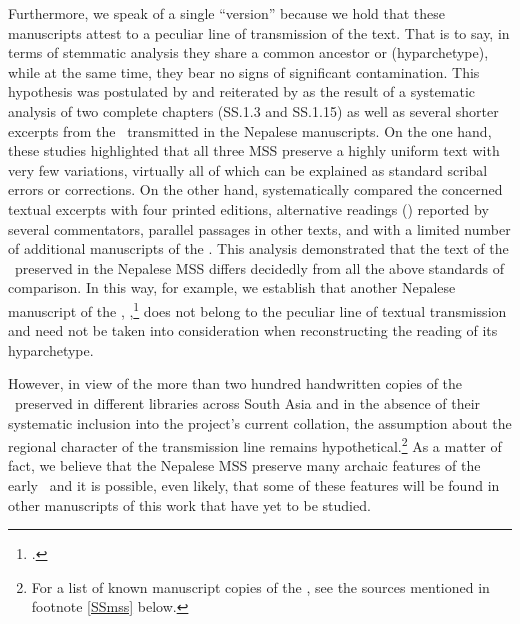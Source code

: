 Furthermore, we speak of a single “version” because we hold that these manuscripts
attest to a peculiar line of transmission of the text.  That is to say, in terms
of stemmatic analysis they share %
a common ancestor or (hyparchetype), while at the same time, they bear no signs of
significant contamination.  This hypothesis was postulated by \citet{kleb-2010}
and reiterated by \citet{kleb-2021a} as the result of a systematic analysis of two
complete chapters (SS.1.3 and SS.1.15) %
as well as several shorter excerpts from the \SS\ transmitted in the Nepalese
manuscripts. On the one hand, these studies highlighted that all three MSS
preserve a highly uniform text with very few variations, virtually all of which
can be explained as standard scribal errors or corrections. On the other hand,
\citet{kleb-2010,kleb-2021a} systematically compared %
the concerned textual excerpts with four printed editions, alternative readings
() reported by several commentators, %
parallel passages in other texts, and with a limited number of additional
manuscripts of the \SS. This analysis demonstrated that the text of the \SS\
preserved in the Nepalese MSS differs decidedly from all the above standards of
comparison. In this way, for example, we establish that another Nepalese
manuscript of the \SS, \MS{Kathmandu NAK 1-1146},\footcite{rima-2022} does not
belong to the peculiar line of textual transmission and need not be taken into
consideration when reconstructing the reading of its hyparchetype.

However, in view of the more than two hundred handwritten copies of the \SS\
preserved in different libraries across South Asia and in the absence of their
systematic inclusion into the project's current collation, the assumption about
the regional character of the transmission line remains hypothetical.\footnote{For
    a list of known manuscript copies of the \SS, see the sources mentioned in
    footnote \ref{SSmss} below.} As a matter of fact, we believe that the Nepalese MSS
    preserve many archaic features of the early \SS\ and it is possible, even likely,
    that some of these features will be found in other manuscripts of this work that
    have yet to be studied.%

